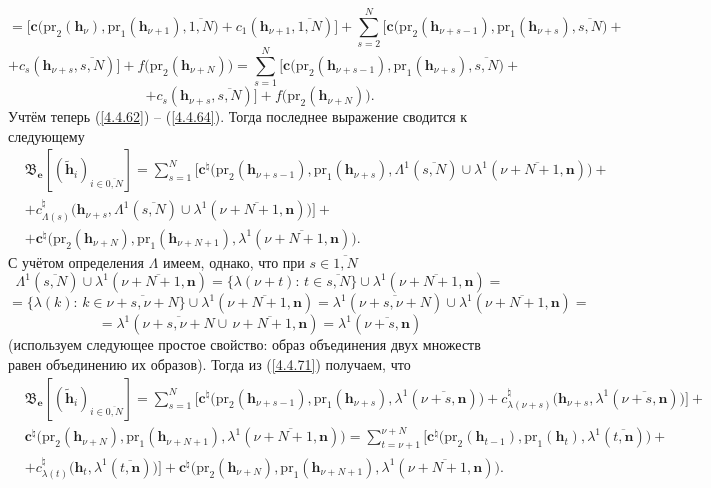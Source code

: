 \documentclass[12pt]{report}
\newcommand{\ov}{\overline}
\newcommand{\La}{\Lambda}
\newcommand{\la}{\lambda}
\begin{document}
{{$$$$
$$
= \bigl[\mathbf{c}\bigl(\mathrm{pr}_2(\mathbf{h}_\nu),\mathrm{pr}_1(\mathbf{h}_{\nu+1}),
\ov{1,N}\bigl) + c_1(\mathbf{h}_{\nu+1},\ov{1,N})\bigl] +
\sum\limits_{s=2}^N\bigl[\mathbf{c}\bigl(\mathrm{pr}_2(\mathbf{h}_{\nu+s-1}),\mathrm{pr}_1
(\mathbf{h}_{\nu+s}),\ov{s,N}\bigl) +
$$
$$
+ c_s(\mathbf{h}_{\nu+s},\ov{s,N})\bigl]
+f\bigl(\mathrm{pr}_2(\mathbf{h}_{\nu+N})\bigl) =
\sum\limits_{s=1}^N\bigl[\mathbf{c}\bigl(\mathrm{pr}_2(\mathbf{h}_{\nu+s-1}),\mathrm{pr}_1
(\mathbf{h}_{\nu+s}),\ov{s,N}\bigl)+
$$
$$+ c_s(\mathbf{h}_{\nu+s},\ov{s,N})\bigl] + f\bigl(\mathrm{pr}_2(\mathbf{h}_{\nu+N})\bigl).
$$
Учтём теперь (\ref{4.4.62}) -- (\ref{4.4.64}). Тогда последнее выражение сводится к следующему
\begin{eqnarray}
&\mathfrak{B}_\mathbf{e}[(\tilde{\mathbf{h}}_i)_{i\in\ov{0,N}}]=
\sum\limits_{s=1}^N \bigl[\mathbf{c}^\natural\bigl(\mathrm{pr}_2(\mathbf{h}_{\nu+s-1}),
\mathrm{pr}_1(\mathbf{h}_{\nu+s}),
\La^1(\ov{s,N})\cup \la^1(\ov{\nu+N+1,\mathbf{n}})\bigl) +
&\nonumber\\
&+ c_{\La(s)}^\natural\bigl(\mathbf{h}_{\nu+s},\La^1(\ov{s,N}) \cup \la^1(\ov{\nu+N+1,\mathbf{n}})\bigl)\bigl]+
&\nonumber\\
&+ \mathbf{c}^\natural\bigl(\mathrm{pr}_2(\mathbf{h}_{\nu+N}),\mathrm{pr}_1(\mathbf{h}_{\nu+N+1}),
\la^1(\ov{\nu+N+1,\mathbf{n}})\bigl).
&\label{4.4.71}
\end{eqnarray}
С учётом определения $\La$ имеем, однако, что при $s\in\ov{1,N}$
$$\La^1(\ov{s,N}) \cup \la^1(\ov{\nu+N+1,\mathbf{n}}) = \{\la(\nu+t):\,t\in \ov{s,N}\} \cup
\la^1(\ov{\nu+N+1,\mathbf{n}}) =
$$
$$=\{\la(k):\,k\in\ov{\nu+s,\nu+N}\} \cup \la^1(\ov{\nu+N+1,\mathbf{n}})=
\la^1(\ov{\nu+s,\nu+N}) \cup \la^1(\ov{\nu+N+1,\mathbf{n}}) =$$
$$= \la^1(\ov{\nu+s,\nu+N} \cup\, \ov{\nu+N+1,\mathbf{n}}) = \la^1(\ov{\nu+s,
\mathbf{n}})
$$
(используем следующее простое свойство: образ объединения двух множеств равен
объединению их образов). Тогда из (\ref{4.4.71}) получаем, что
\begin{eqnarray}
&\mathfrak{B}_\mathbf{e}[(\tilde{\mathbf{h}}_i)_{i\in\ov{0,N}}]=
\sum\limits_{s=1}^N \bigl[\mathbf{c}^\natural\bigl(\mathrm{pr}_2(\mathbf{h}_{\nu+s-1}),
\mathrm{pr}_1(\mathbf{h}_{\nu+s}),
\la^1(\ov{\nu+s,\mathbf{n}})\bigl) + c_{\la(\nu+s)}^\natural(\mathbf{h}_{\nu+s},
\la^1(\ov{\nu+s,\mathbf{n}})\bigl)\bigl] +
&\nonumber\\
&\mathbf{c}^\natural\bigl(\mathrm{pr}_2(\mathbf{h}_{\nu+N}),\mathrm{pr}_1(\mathbf{h}_{\nu+N+1}),
\la^1(\ov{\nu+N+1,\mathbf{n}})\bigl) =
\sum\limits_{t=\nu+1}^{\nu+N}\bigl[\mathbf{c}^\natural\bigl(\mathrm{pr}_2(\mathbf{h}_{t-1}),
\mathrm{pr}_1(\mathbf{h}_t),\la^1(\ov{t,\mathbf{n}})\bigl)+
&\nonumber\\
&+ c_{\la(t)}^\natural\bigl(\mathbf{h}_t,\la^1(\ov{t,\mathbf{n}})\bigl)\bigl] +
\mathbf{c}^\natural\bigl(\mathrm{pr}_2(\mathbf{h}_{\nu+N}),\mathrm{pr}_1(\mathbf{h}_{\nu+N+1}),
\la^1(\ov{\nu+N+1,\mathbf{n}})\bigl).
&\label{4.4.72}
\end{eqnarray}

}}
\end{document}
